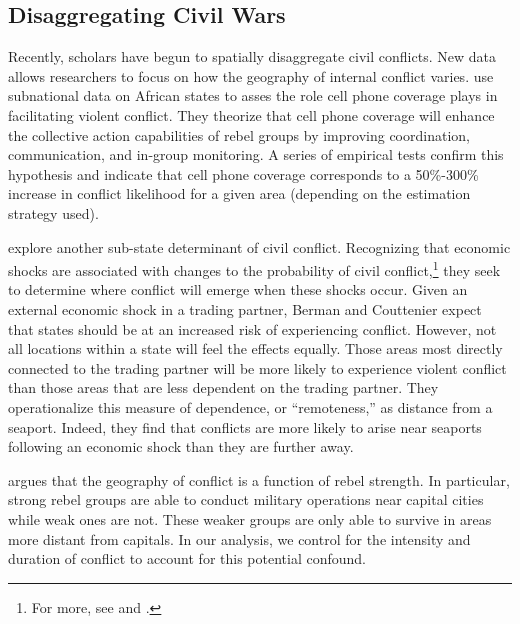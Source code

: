 \subsection{Disaggregating Civil Wars}

Recently, scholars have begun to spatially disaggregate civil conflicts. New data allows researchers to focus on how the geography of internal conflict varies. \citet{pierskalla:hollenbach:2013} use subnational data on African states to asses the role cell phone coverage plays in facilitating violent conflict. They theorize that cell phone coverage will enhance the collective action capabilities of rebel groups by improving coordination, communication, and in-group monitoring. A series of empirical tests confirm this hypothesis and indicate that cell phone coverage corresponds to a 50\%-300\% increase in conflict likelihood for a given area (depending on the estimation strategy used).

\citet{berman:couttenier:2013} explore another sub-state determinant of civil conflict. Recognizing that economic shocks are associated with changes to the probability of civil conflict,\footnote{For more, see \citet{miguel:etal:2004} and \citet{dube:vargas:2013}.} they seek to determine where conflict will emerge when these shocks occur. Given an external economic shock in a trading partner, Berman and Couttenier expect that states should be at an increased risk of experiencing conflict. However, not all locations within a state will feel the effects equally. Those areas most directly connected to the trading partner will be more likely to experience violent conflict than those areas that are less dependent on the trading partner. They operationalize this measure of dependence, or ``remoteness,'' as distance from a seaport. Indeed, they find that conflicts are more likely to arise near seaports following an economic shock than they are further away.

\citet{buhaug:2010} argues that the geography of conflict is a function of rebel strength. In particular, strong rebel groups are able to conduct military operations near capital cities while weak ones are not. These weaker groups are only able to survive in areas more distant from capitals. In our analysis, we control for the intensity and duration of conflict to account for this potential confound.